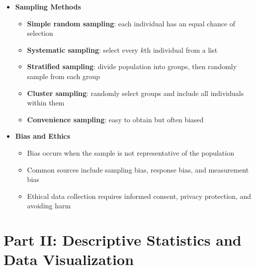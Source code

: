 \documentclass{article}
\begin{document}
\begin{itemize}
\item \textbf{Sampling Methods}
\begin{itemize}
  \item \textbf{Simple random sampling}: each individual has an equal chance of selection
  \item \textbf{Systematic sampling}: select every $k$th individual from a list
  \item \textbf{Stratified sampling}: divide population into groups, then randomly sample from each group
  \item \textbf{Cluster sampling}: randomly select groups and include all individuals within them
  \item \textbf{Convenience sampling}: easy to obtain but often biased
\end{itemize}

\item \textbf{Bias and Ethics}
\begin{itemize}
  \item Bias occurs when the sample is not representative of the population
  \item Common sources include sampling bias, response bias, and measurement bias
  \item Ethical data collection requires informed consent, privacy protection, and avoiding harm
\end{itemize}

\end{itemize}

\section*{Part II: Descriptive Statistics and Data Visualization}
\end{document}
